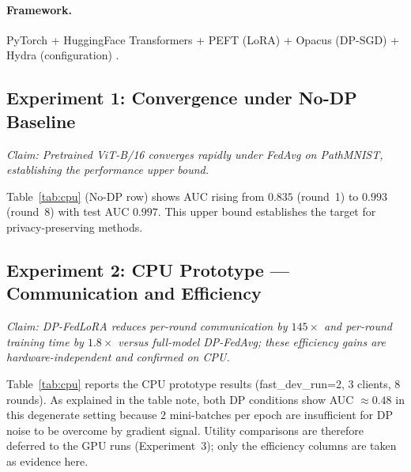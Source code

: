 ﻿\documentclass{article}
\newcommand{\method}{DP-FedLoRA}
\begin{document}
\paragraph{Framework.}
PyTorch + HuggingFace Transformers + PEFT (LoRA) + Opacus (DP-SGD) +
Hydra (configuration) \citep{yousefpour2021opacus}.

\subsection{Experiment 1: Convergence under No-DP Baseline}
\label{sec:exp:nodp}

\emph{Claim: Pretrained ViT-B/16 converges rapidly under FedAvg on
PathMNIST, establishing the performance upper bound.}

Table~\ref{tab:cpu} (No-DP row) shows AUC rising from $0.835$ (round~1) to
$0.993$ (round~8) with test AUC $0.997$.
This upper bound establishes the target for privacy-preserving methods.

\subsection{Experiment 2: CPU Prototype --- Communication and Efficiency}
\label{sec:exp:dp}

\emph{Claim: \method{} reduces per-round communication by $145{\times}$ and
per-round training time by $1.8{\times}$ versus full-model DP-FedAvg;
these efficiency gains are hardware-independent and confirmed on CPU.}

Table~\ref{tab:cpu} reports the CPU prototype results (fast\_dev\_run=2,
$3$ clients, $8$ rounds).
As explained in the table note, both DP conditions show AUC $\approx 0.48$
in this degenerate setting because $2$ mini-batches per epoch are
insufficient for DP noise to be overcome by gradient signal.
Utility comparisons are therefore deferred to the GPU runs
(Experiment~3); only the efficiency columns are taken as evidence here.
\end{document}
